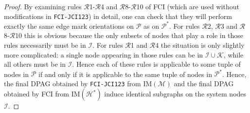 \documentclass[twoside,11pt]{article}
\newcommand\C[1]{\mathcal{#1}}
\newcommand{\IM}{\mathrm{IM}}
\newcommand{\alg}[1]{\texttt{#1}}
\begin{document}
\begin{proof}
  By examining rules $\C{R}$1-$\C{R}$4 and $\C{R}$8-$\C{R}$10 of FCI (which are used without modifications in \alg{FCI-JCI123}) in detail, one can check that they will perform exactly the same edge mark orientations on $\C{P}$ as on $\C{P}^*$.
  For rules $\C{R}$2, $\C{R}$3 and $\C{R}$8-$\C{R}$10 this is obvious because the only subsets of nodes that play a role in those rules necessarily must be in $\C{I}$. 
  For rules $\C{R}$1 and $\C{R}$4 the situation is only slightly more complicated: a single node appearing in those rules can be in $\C{I} \cup \C{K}$, while all others must be in $\C{I}$. 
  Hence each of these rules is applicable to some tuple of nodes in $\C{P}$ if and only if it is applicable to the same tuple of nodes in $\C{P}^*$. 
  Hence, the final DPAG obtained by \alg{FCI-JCI123} from $\IM(\C{M})$ and the final DPAG obtained by FCI from $\IM(\C{H}^*)$ induce identical subgraphs on the system nodes $\C{I}$.
  

\end{proof}
\end{document}

